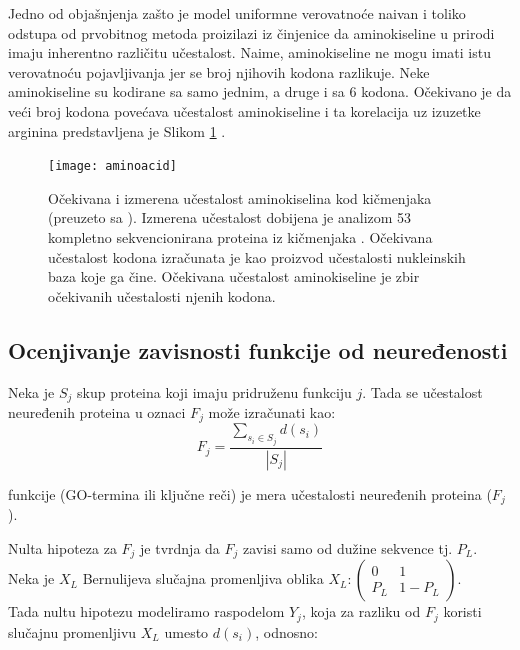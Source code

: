Jedno od objašnjenja zašto je model uniformne verovatnoće naivan i toliko
odstupa od prvobitnog metoda proizilazi iz činjenice da aminokiseline u prirodi
imaju inherentno različitu učestalost. Naime, aminokiseline ne mogu  imati istu
verovatnoću pojavljivanja jer se  broj njihovih kodona razlikuje. Neke
aminokiseline su kodirane sa samo jednim, a druge i sa 6 kodona. Očekivano je
da veći broj kodona povećava učestalost aminokiseline i ta korelacija uz
izuzetke arginina predstavljena je Slikom \ref{fig:aminoacid}
\parencite{AKfrekvencija}.

\begin{figure}[th]
\centering
\texttt{[image: aminoacid]}
\caption{Očekivana i izmerena učestalost aminokiselina kod kičmenjaka (preuzeto sa \cite{AA_freq_link}).  \footnotesize
  Izmerena učestalost dobijena je analizom 53 kompletno sekvencionirana proteina iz kičmenjaka \cite{King1969}.
  Očekivana učestalost kodona izračunata je kao proizvod učestalosti nukleinskih baza koje ga čine.
  Očekivana učestalost aminokiseline je zbir očekivanih učestalosti njenih kodona.
}
\label{fig:aminoacid}
\end{figure}




\clearpage
\label{ocenjivanje}
\subsection{Ocenjivanje zavisnosti funkcije od neuređenosti}

Neka je $S_j$ skup proteina koji imaju pridruženu funkciju $j$. Tada se učestalost
neuređenih proteina u oznaci $F_j$ može izračunati kao:
$$F_j = \dfrac{\sum_{s_i \in S_j} d(s_i)} {|S_j|} $$


\begin{definicija}
  \label{neuredjenost}

   funkcije (GO-termina ili ključne reči) je mera učestalosti
  neuređenih proteina ($F_j$).
\end{definicija}


Nulta hipoteza za $F_j$ je tvrdnja da $F_j$ zavisi samo od dužine sekvence tj. $P_L$. \\
Neka je $X_L$ Bernulijeva slučajna promenljiva oblika $X_L : \begin{pmatrix} 0 & 1\\ P_L & 1-P_L \end{pmatrix}$. \\
Tada nultu hipotezu modeliramo raspodelom $Y_j$, koja za razliku od $F_j$ koristi
slučajnu promenljivu $X_L$ umesto  $d(s_i)$, odnosno:


